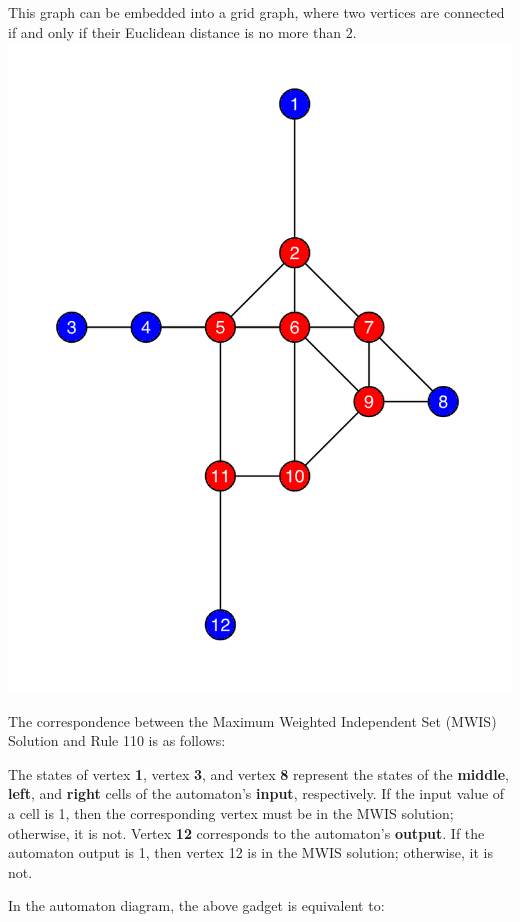 \documentclass[twocolumn,superscriptaddress,english,showpacs,longbibliography]{revtex4-2}
\begin{document}
This graph can be embedded into a grid graph, where two vertices are
connected if and only if their Euclidean distance is no more than $2$.
\includegraphics[width=\columnwidth]{../notes/images/image-1.png}

The correspondence between the Maximum Weighted Independent Set (MWIS)
Solution and Rule 110 is as follows:

The states of vertex \textbf{1}, vertex \textbf{3}, and vertex
\textbf{8} represent the states of the \textbf{middle}, \textbf{left},
and \textbf{right} cells of the automaton's \textbf{input},
respectively. If the input value of a cell is 1, then the corresponding
vertex must be in the MWIS solution; otherwise, it is not. Vertex
\textbf{12} corresponds to the automaton's \textbf{output}. If the
automaton output is 1, then vertex 12 is in the MWIS solution;
otherwise, it is not.

In the automaton diagram, the above gadget is equivalent to:
\end{document}

